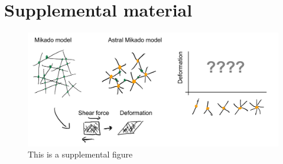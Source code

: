 \documentclass[onecolumn,11pt]{article}
\begin{document}



\clearpage
\setcounter{table}{0}
        \renewcommand{\thetable}{S\arabic{table}}%
\setcounter{figure}{0}
        \renewcommand{\thefigure}{S\arabic{figure}}%
\renewcommand{\listfigurename}{List of Supporting Figures}
\renewcommand{\contentsname}{List of Supporting Text}

\section{Supplemental material}

\begin{figure}[h!t]
\centering
\includegraphics[width=4.5in]{figures/figJeanJacket.pdf}
\caption{This is a supplemental figure}
\label{fig:DetailedJeanJacketSchematic}
\end{figure}
\end{document}
